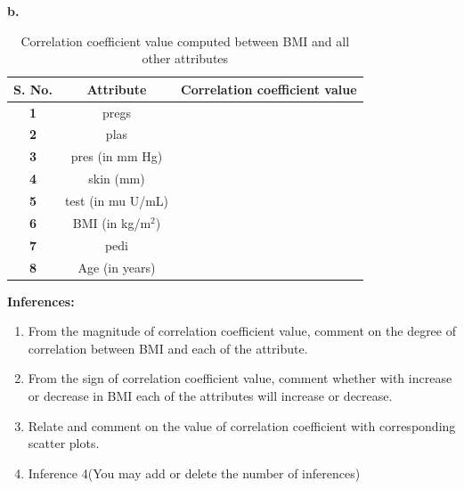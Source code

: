 \documentclass[12 pt, a4paper]{article}
\theoremstyle{definition}
\begin{document}
\clearpage
\textbf{b.}
\begin{table}[H]
	\caption{Correlation coefficient value computed between BMI and all other attributes}
	\label{tab:Database}
	\centering
	\begin{tabular}{|c|c|c|}
	\hline
		\textbf{S. No.}& \textbf{Attribute} & \textbf{Correlation coefficient value}  \\ \hline
		
		\textbf{1}          & pregs          &                    \\ \hline
		\textbf{2}           & plas            &        \\ \hline
		\textbf{3}          & pres (in mm Hg)          &            \\ \hline
		\textbf{4}       & skin (mm)         &         \\ \hline
		\textbf{5}           & test (in mu U/mL)           &        \\ \hline
			\textbf{6}           & BMI (in kg/m$^{2 }$)           &               \\ \hline
		\textbf{7}          & pedi          &     \\ \hline
		\textbf{8}       & Age (in years)          &            \\ \hline
	
		
	\end{tabular}
\end{table}

\textbf{\Large Inferences:}
\begin{enumerate}
   \item From the magnitude of correlation coefficient value, comment on the degree of correlation between BMI and each of the attribute.
    \item From the sign of correlation coefficient value, comment whether with increase or decrease in BMI each of the attributes will increase or decrease.
        \item Relate and comment on the value of correlation coefficient with corresponding scatter plots.
   \item Inference 4(You may add or delete the number of inferences)
\end{enumerate}
\end{document}
